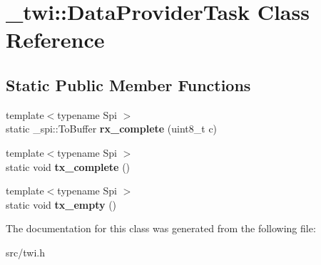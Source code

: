\hypertarget{class__twi_1_1DataProviderTask}{}\section{\+\_\+twi\+:\+:Data\+Provider\+Task Class Reference}
\label{class__twi_1_1DataProviderTask}
\subsection*{Static Public Member Functions}
\begin{DoxyCompactItemize}
\item 
\hypertarget{class__twi_1_1DataProviderTask_a97ec8438e4392efbc82b9986898e3a6f}{}\label{class__twi_1_1DataProviderTask_a97ec8438e4392efbc82b9986898e3a6f} 
{\footnotesize template$<$typename Spi $>$ }\\static \+\_\+spi\+::\+To\+Buffer {\bfseries rx\+\_\+complete} (uint8\+\_\+t c)
\item 
\hypertarget{class__twi_1_1DataProviderTask_a798713533cf2de2ac0961a3c84c5021b}{}\label{class__twi_1_1DataProviderTask_a798713533cf2de2ac0961a3c84c5021b} 
{\footnotesize template$<$typename Spi $>$ }\\static void {\bfseries tx\+\_\+complete} ()
\item 
\hypertarget{class__twi_1_1DataProviderTask_af36db8eb3879e9a0229fbfd2d24a8c01}{}\label{class__twi_1_1DataProviderTask_af36db8eb3879e9a0229fbfd2d24a8c01} 
{\footnotesize template$<$typename Spi $>$ }\\static void {\bfseries tx\+\_\+empty} ()
\end{DoxyCompactItemize}


The documentation for this class was generated from the following file\+:\begin{DoxyCompactItemize}
\item 
src/twi.\+h\end{DoxyCompactItemize}
